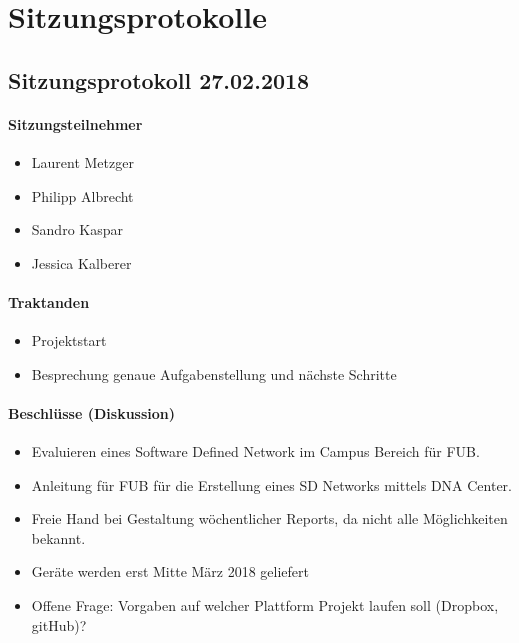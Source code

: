 \section{Sitzungsprotokolle}

\subsection{Sitzungsprotokoll 27.02.2018}

\paragraph{Sitzungsteilnehmer}
\begin{itemize}	
	\item Laurent Metzger 
	\item Philipp Albrecht
	\item Sandro Kaspar
	\item Jessica Kalberer
\end{itemize}

\paragraph{Traktanden}
\begin{itemize}	
	\item Projektstart
	\item Besprechung genaue Aufgabenstellung und nächste Schritte
\end{itemize}

\paragraph{Beschlüsse (Diskussion)}
\begin{itemize}	
	\item Evaluieren eines Software Defined Network im Campus Bereich für FUB.
	\item Anleitung für FUB für die Erstellung eines SD Networks mittels DNA Center.
	\item Freie Hand bei Gestaltung wöchentlicher Reports, da nicht alle Möglichkeiten bekannt.
	\item Geräte werden erst Mitte März 2018 geliefert
	\item Offene Frage: Vorgaben auf welcher Plattform Projekt laufen soll (Dropbox, gitHub)?
\end{itemize}

